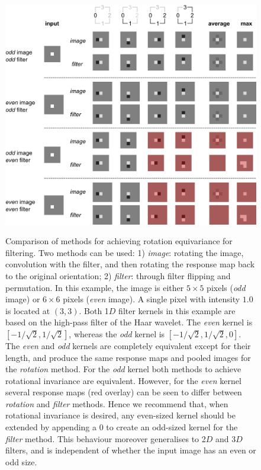 \documentclass[fleqn,a4paper,oneside,openany]{book}
\begin{document}
\begin{figure}
    \centering
    \includegraphics[trim= 0 0 0 0, clip, width=\linewidth]{rotational_invariance_comparison.png}\\
    \caption{Comparison of methods for achieving rotation equivariance for filtering. Two methods can be used: 1) \textit{image}: rotating the image, convolution with the filter, and then rotating the response map back to the original orientation; 2) \textit{filter}: through filter flipping and permutation. In this example, the image is either $5 \times 5$ pixels (\textit{odd} image) or $6 \times 6$ pixels (\textit{even} image). A single pixel with intensity $1.0$ is located at $(3,3)$. Both 1$D$ filter kernels in this example are based on the high-pass filter of the Haar wavelet. The \textit{even} kernel is $\left[-1 / \sqrt{2}, 1 / \sqrt{2} \right]$, whereas the \textit{odd} kernel is $\left[-1 / \sqrt{2}, 1 / \sqrt{2}, 0 \right]$. The \textit{even} and \textit{odd} kernels are completely equivalent except for their length, and produce the same response maps and pooled images for the \textit{rotation} method. For the \textit{odd} kernel both methods to achieve rotational invariance are equivalent. However, for the \textit{even} kernel several response maps (red overlay) can be seen to differ between \textit{rotation} and \textit{filter} methods. Hence we recommend that, when rotational invariance is desired, any even-sized kernel should be extended by appending a $0$ to create an odd-sized kernel for the \textit{filter} method. This behaviour moreover generalises to 2$D$ and 3$D$ filters, and is independent of whether the input image has an even or odd size.}
    \label{fig:rotation_invariance_comparison}
\end{figure}
\end{document}
